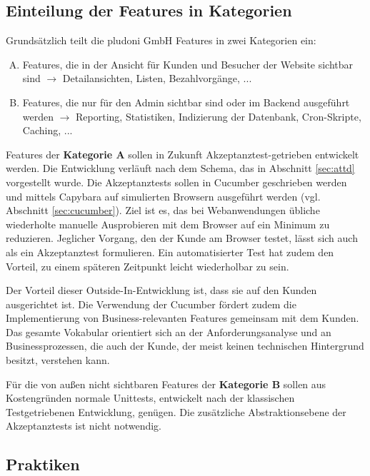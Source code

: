 \subsection{Einteilung der Features in Kategorien}
Grundsätzlich teilt die pludoni GmbH Features in zwei Kategorien ein:

\begin{enumerate}[A.]

 \item Features, die in der Ansicht für Kunden und Besucher der Website sichtbar sind $\to$ Detailansichten, Listen, Bezahlvorgänge, ...
 \item Features, die nur für den Admin sichtbar sind oder im Backend ausgeführt werden $\to$ Reporting, Statistiken, Indizierung der Datenbank, Cron-Skripte, Caching, ...
\end{enumerate}

Features der \textbf{Kategorie A} sollen in Zukunft Akzeptanztest-getrieben entwickelt werden. Die Entwicklung verläuft nach dem Schema, das in Abschnitt \ref{sec:attd} vorgestellt wurde. Die Akzeptanztests sollen in Cucumber geschrieben werden und mittels Capybara auf simulierten Browsern ausgeführt werden (vgl. Abschnitt \ref{sec:cucumber}).
Ziel ist es, das bei Webanwendungen übliche wiederholte manuelle Ausprobieren mit dem Browser auf ein Minimum zu reduzieren. Jeglicher Vorgang, den der Kunde am Browser testet, lässt sich auch als ein Akzeptanztest formulieren. Ein automatisierter Test hat zudem den Vorteil, zu einem späteren Zeitpunkt leicht wiederholbar zu sein.

Der Vorteil dieser Outside-In-Entwicklung ist, dass sie auf den Kunden ausgerichtet ist. Die Verwendung der  Cucumber fördert zudem die Implementierung von Business-relevanten Features gemeinsam mit dem Kunden. Das gesamte Vokabular orientiert sich an der Anforderungsanalyse und an Businessprozessen, die auch der Kunde, der meist keinen technischen Hintergrund besitzt, verstehen kann.

Für die von außen nicht sichtbaren Features der \textbf{Kategorie B} sollen aus Kostengründen normale Unittests, entwickelt nach der klassischen Testgetriebenen Entwicklung, genügen. Die zusätzliche Abstraktionsebene der Akzeptanztests ist nicht notwendig.

\subsection{Praktiken}
\label{sec:auswahlWeitere}

